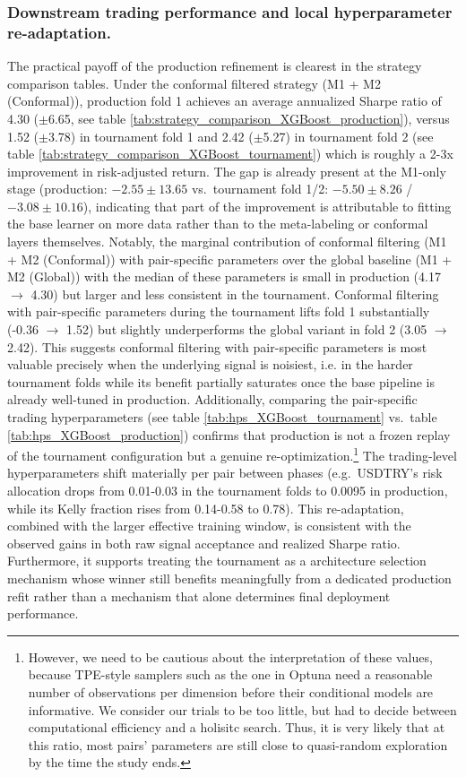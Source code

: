 \documentclass[12pt, a4paper]{article}
\begin{document}
\subsubsection{Downstream trading performance and local hyperparameter re-adaptation.}
The practical payoff of the production refinement is clearest in the strategy comparison tables. Under the conformal filtered strategy (M1 + M2 (Conformal)), production fold 1 
achieves an average annualized Sharpe ratio of 4.30 ($\pm$6.65, see table \ref{tab:strategy_comparison_XGBoost_production}), versus 1.52 ($\pm$3.78) in tournament fold 1 and 2.42 
($\pm$5.27) in tournament fold 2 (see table \ref{tab:strategy_comparison_XGBoost_tournament}) which is roughly a 2-3x improvement in risk-adjusted return. The gap is already 
present at the M1-only stage (production: $-2.55 \pm 13.65$ vs.\ tournament fold 1/2: $-5.50 \pm 8.26$ / $-3.08 \pm 10.16$), indicating that part of the improvement is 
attributable to fitting the base learner on more data rather than to the meta-labeling or conformal layers themselves. Notably, the marginal contribution of conformal filtering 
(M1 + M2 (Conformal)) with pair-specific parameters over the global baseline (M1 + M2 (Global)) with the median of these parameters is small in production (4.17 $\to$ 4.30) but 
larger and less consistent in the tournament. Conformal filtering with pair-specific parameters during the tournament lifts fold 1 substantially (-0.36 $\to$ 1.52) but slightly 
underperforms the global variant in fold 2 (3.05 $\to$ 2.42). This suggests conformal filtering with pair-specific parameters is most valuable precisely when the underlying signal 
is noisiest, i.e. in the harder tournament folds while its benefit partially saturates once the base pipeline is already well-tuned in production.
Additionally, comparing the pair-specific trading hyperparameters (see table \ref{tab:hps_XGBoost_tournament} vs.\ table \ref{tab:hps_XGBoost_production}) confirms that production 
is not a frozen replay of the tournament configuration but a genuine re-optimization.\footnote{However, we need to be cautious about the interpretation of these values, because 
TPE-style samplers such as the one in Optuna need a reasonable number of observations per dimension before their conditional models are informative. We consider our trials to be 
too little, but had to decide between computational efficiency and a holisitc search. Thus, it is very likely that at this ratio, most pairs' parameters are still close to 
quasi-random exploration by the time the study ends.} The trading-level hyperparameters shift materially per pair between phases 
(e.g.\ USDTRY's risk allocation drops from 0.01-0.03 in the tournament folds to 0.0095 in production, while its Kelly fraction rises from 0.14-0.58 to 0.78). This re-adaptation, 
combined with the larger effective training window, is consistent with the observed gains in both raw signal acceptance and realized Sharpe ratio. Furthermore, it supports 
treating the tournament as a architecture selection mechanism whose winner still benefits meaningfully from a dedicated production refit rather than a mechanism that alone 
determines final deployment performance.
\end{document}
